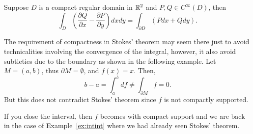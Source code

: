 \begin{corollary}
  Suppose $D$ is a compact regular domain in $\mathbb{R}^2$ and $P,Q\in C^\infty(D)$, then
  \begin{equation}
    \int_D \left(\frac{\partial Q}{\partial x} - \frac{\partial P}{\partial y}\right)dxdy = \int_{\partial D}(Pdx + Qdy).
  \end{equation}
\end{corollary}

\begin{remark}
  The requirement of compactness in Stokes' theorem may seem there just to avoid technicalities involving the convergence of the integral, however, it also avoid subtleties due to the boundary as shown in the following example.
  Let $M=(a,b)$, thus $\partial M = \emptyset$, and $f(x)=x$.
  Then,
  \begin{equation}
    b-a = \int_a^b df \neq \int_{\partial M} f = 0.
  \end{equation}
  But this does not contradict Stokes' theorem since $f$ is not compactly supported.

  If you close the interval, then $f$ becomes with compact support and we are back in the case of Example~\ref{ex:intint} where we had already seen Stokes' theorem.
\end{remark}

